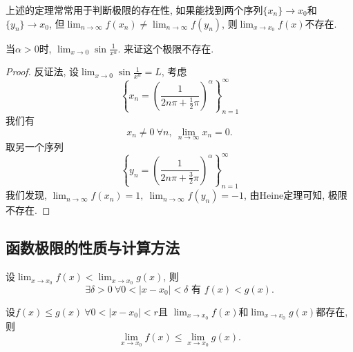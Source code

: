 
上述的定理常常用于判断极限的存在性, 如果能找到两个序列$\{ x_n \} \to x_0$和$\{ y_n \}\to x_0$, 但$\lim_{n \to \infty} f\left( x_n \right) \neq  \lim_{n \to \infty}f\left( y_n \right) $, 则$\lim_{x \to x_0} f\left( x \right) $不存在.

\begin{example}
    当$\alpha > 0 $时, $\lim_{x \to 0} \sin \frac{1}{x^{\alpha}}$. 来证这个极限不存在.
    \begin{proof}
        反证法, 设$\lim_{x \to 0}\sin \frac{1}{x^{\alpha}} = L$, 考虑
        \begin{equation}
          \left\{ x_n = \left( \frac{1}{2n \pi +\frac{1}{2}\pi} \right) ^{\alpha} \right\}_{n=1}^{\infty}
        \end{equation}
        我们有
        \begin{equation}
          x_n \neq 0\ \forall n, \ \lim_{n \to \infty} x_n = 0.
        \end{equation}
        取另一个序列
        \begin{equation}
          \left\{ y_n = \left( \frac{1}{2n\pi + \frac{3}{2}\pi} \right) ^{\alpha} \right\} _{n=1}^{\infty}
        \end{equation}
        我们发现, $\lim_{n \to \infty} f\left( x_n \right) = 1,\ \lim_{n \to \infty}f\left( y_n \right) = -1$, 由Heine定理可知, 极限不存在.
    \end{proof}
\end{example}

\subsection{函数极限的性质与计算方法}
\begin{proposition}\label{保持极限不等式}
    设$\displaystyle \lim_{x \to x_0} f\left( x \right) < \lim_{x \to x_0} g\left( x \right) $, 则
    \begin{equation}
      \exists \delta > 0 \ \forall 0 < \left| x-x_0 \right| < \delta \text{ 有 } f\left( x \right) < g\left( x \right) .
    \end{equation}
\end{proposition}

\begin{proposition}
    设$f\left( x \right) \le  g\left( x \right) \ \forall 0 < \left| x-x_0 \right| < r$且 $\displaystyle \lim_{x \to x_0} f\left( x \right) $和$\displaystyle  \lim_{x \to x_0} g\left( x \right) $都存在, 则
    \begin{equation}
      \lim_{x \to x_0} f\left( x \right) \le \lim_{x \to x_0} g\left( x \right) .
    \end{equation}
\end{proposition}

